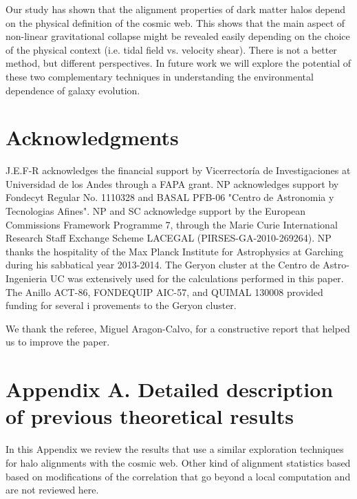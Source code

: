 \documentclass[useAMS,usenatbib]{mn2e}
\begin{document}
Our study has shown that the alignment properties of dark matter
halos depend on the physical definition of the cosmic web. This shows
that the main aspect of non-linear gravitational collapse might be
revealed easily depending on the choice of the physical context
(i.e. tidal field vs. velocity shear). There is not a better method,
but different perspectives. In future work we will explore the
potential of these two complementary techniques in understanding the
environmental dependence of galaxy evolution.

\section*{Acknowledgments}

J.E.F-R acknowledges the financial support by Vicerrector\'ia de
Investigaciones at Universidad de los Andes through a FAPA grant.
NP acknowledges support by Fondecyt Regular No. 1110328 and BASAL PFB-06 "Centro de Astronomia y Tecnologias Afines".
NP and SC acknowledge support by the European Commissions Framework
Programme 7, through the Marie Curie International Research Staff
Exchange Scheme LACEGAL (PIRSES-GA-2010-269264). NP thanks the
hospitality of the Max Planck Institute for Astrophysics at Garching
during his sabbatical year 2013-2014. The Geryon cluster at the Centro de Astro-Ingenieria UC was extensively used for the calculations performed in this paper.
The Anillo ACT-86, FONDEQUIP AIC-57, and QUIMAL 130008 provided
funding for several i provements to the Geryon cluster.

We thank the referee, Miguel Aragon-Calvo, for a constructive report
that helped us to improve the paper.  



\section*{Appendix A. Detailed description of previous theoretical results}

In this Appendix we review the results that use a similar exploration
techniques for halo alignments with the cosmic web. Other kind of
alignment statistics based based on modifications of the correlation
\citep[e.g.][]{Paz2008,Faltenbacher2009} that go beyond a local computation
and are not reviewed here.
\end{document}
